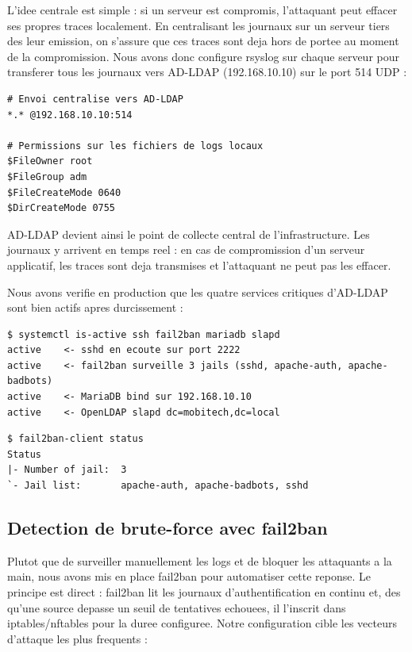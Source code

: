 \documentclass[11pt,a4paper]{article}
\begin{document}
L'idee centrale est simple : si un serveur est compromis, l'attaquant peut effacer ses propres traces localement. En centralisant les journaux sur un serveur tiers des leur emission, on s'assure que ces traces sont deja hors de portee au moment de la compromission. Nous avons donc configure rsyslog sur chaque serveur pour transferer tous les journaux vers AD-LDAP (192.168.10.10) sur le port 514 UDP :

\begin{lstlisting}[caption={Ajout dans /etc/rsyslog.conf sur chaque serveur}]
# Envoi centralise vers AD-LDAP
*.* @192.168.10.10:514

# Permissions sur les fichiers de logs locaux
$FileOwner root
$FileGroup adm
$FileCreateMode 0640
$DirCreateMode 0755
\end{lstlisting}

AD-LDAP devient ainsi le point de collecte central de l'infrastructure. Les journaux y arrivent en temps reel : en cas de compromission d'un serveur applicatif, les traces sont deja transmises et l'attaquant ne peut pas les effacer.

Nous avons verifie en production que les quatre services critiques d'AD-LDAP sont bien actifs apres durcissement :

\begin{lstlisting}[caption={Sortie reelle -- etat des services sur AD-LDAP}]
$ systemctl is-active ssh fail2ban mariadb slapd
active    <- sshd en ecoute sur port 2222
active    <- fail2ban surveille 3 jails (sshd, apache-auth, apache-badbots)
active    <- MariaDB bind sur 192.168.10.10
active    <- OpenLDAP slapd dc=mobitech,dc=local
\end{lstlisting}

\begin{lstlisting}[caption={Sortie reelle -- fail2ban jails actives}]
$ fail2ban-client status
Status
|- Number of jail:  3
`- Jail list:       apache-auth, apache-badbots, sshd
\end{lstlisting}

\subsection{Detection de brute-force avec fail2ban}

Plutot que de surveiller manuellement les logs et de bloquer les attaquants a la main, nous avons mis en place fail2ban pour automatiser cette reponse. Le principe est direct : fail2ban lit les journaux d'authentification en continu et, des qu'une source depasse un seuil de tentatives echouees, il l'inscrit dans iptables/nftables pour la duree configuree. Notre configuration cible les vecteurs d'attaque les plus frequents :
\end{document}
